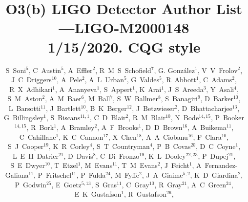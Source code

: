 \documentclass[12pt]{iopart}
\begin{document}
\title{O3(b) LIGO Detector Author List---LIGO-M2000148\\
1/15/2020. CQG style}
\author{%
S~Soni$^{5}$,  %
C~Austin$^{5}$,  %
A~Effler$^{2}$,  %
R~M~S~Schofield$^{7}$,  %
G. Gonz\'alez$^1$, %
V~V~Frolov$^{2}$,  %
J~C~Driggers$^{10}$,  %
A~Pele$^{2}$,  %
A~L~Urban$^{5}$,  %
G~Valdes$^{5}$,  %
R~Abbott$^{1}$,  %
C~Adams$^{2}$,  %
R~X~Adhikari$^{1}$,  %
A~Ananyeva$^{1}$,  %
S~Appert$^{1}$,  %
K~Arai$^{1}$,  %
J~S~Areeda$^{3}$,  %
Y~Asali$^{4}$,  %
S~M~Aston$^{2}$,  %
A~M~Baer$^{6}$,  %
M~Ball$^{7}$,  %
S~W~Ballmer$^{8}$,  %
S~Banagiri$^{9}$,  %
D~Barker$^{10}$,  %
L~Barsotti$^{11}$,  %
J~Bartlett$^{10}$,  %
B~K~Berger$^{12}$,  %
J~Betzwieser$^{2}$,  %
D~Bhattacharjee$^{13}$,  %
G~Billingsley$^{1}$,  %
S~Biscans$^{11,1}$,  %
C~D~Blair$^{2}$,  %
R~M~Blair$^{10}$,  %
N~Bode$^{14,15}$,  %
P~Booker$^{14,15}$,  %
R~Bork$^{1}$,  %
A~Bramley$^{2}$,  %
A~F~Brooks$^{1}$,  %
D~D~Brown$^{16}$,  %
A~Buikema$^{11}$,  %
C~Cahillane$^{1}$,  %
K~C~Cannon$^{17}$,  %
X~Chen$^{18}$,  %
A~A~Ciobanu$^{16}$,  %
F~Clara$^{10}$,  %
S~J~Cooper$^{19}$,  %
K~R~Corley$^{4}$,  %
S~T~Countryman$^{4}$,  %
P~B~Covas$^{20}$,  %
D~C~Coyne$^{1}$,  %
L~E~H~Datrier$^{21}$,  %
D~Davis$^{8}$,  %
C~Di~Fronzo$^{19}$,  %
K~L~Dooley$^{22,23}$,  %
P~Dupej$^{21}$,  %
S~E~Dwyer$^{10}$,  %
T~Etzel$^{1}$,  %
M~Evans$^{11}$,  %
T~M~Evans$^{2}$,  %
J~Feicht$^{1}$,  %
A~Fernandez-Galiana$^{11}$,  %
P~Fritschel$^{11}$,  %
P~Fulda$^{24}$,  %
M~Fyffe$^{2}$,  %
J~A~Giaime$^{5,2}$,  %
K~D~Giardina$^{2}$,  %
P~Godwin$^{25}$,  %
E~Goetz$^{5,13}$,  %
S~Gras$^{11}$,  %
C~Gray$^{10}$,  %
R~Gray$^{21}$,  %
A~C~Green$^{24}$,  %
E~K~Gustafson$^{1}$,  %
R~Gustafson$^{26}$,  %
}
\end{document}
